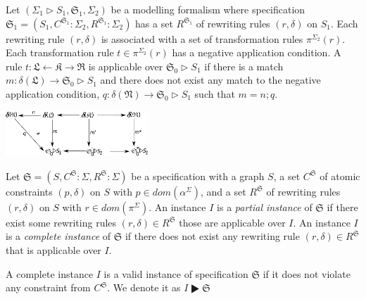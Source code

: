 \documentclass{eceasst}
\begin{document}
\begin{definition}
 Let $(\Sigma_1 \rhd S_1, \mathfrak{S}_1, \Sigma_2)$ be a modelling formalism where specification $\mathfrak{S}_1 = (S_1, C^{\mathfrak{S}_1}:\Sigma_2, R^{\mathfrak{S}_1}:\Sigma_2)$ 
 has a set $R^{\mathfrak{S}_1}$ of rewriting rules $(r, \delta)$ on $S_1$.
 Each rewriting rule $(r, \delta)$ is associated with a set of transformation rules $\pi^{\Sigma_2}(r)$. 
Each transformation rule $t \in \pi^{\Sigma_2}(r)$ has a negative application condition. 
A rule $t: \mathfrak{L} \leftarrow \mathfrak{K} \rightarrow  \mathfrak{R}$ is applicable over $\mathfrak{S}_0 \rhd S_1$ 
if there is a match $m : \delta( \mathfrak{L}) \rightarrow \mathfrak{S}_0 \rhd S_1$ 
and there does not exist any match to the negative application condition, $q : \delta( \mathfrak{N}) \rightarrow \mathfrak{S}_0 \rhd S_1$ such that $m = n ; q$. 

\begin{center}
\includegraphics[width=0.4\textwidth]{dpo2.pdf}
\end{center}
\end{definition}


\begin{definition}
 Let $\mathfrak{S} = (S, C^{\mathfrak{S}}:\Sigma, R^{\mathfrak{S}}:\Sigma )$ be a specification with 
 a graph $S$, 
 a set $C^\mathfrak{S}$ of atomic constraints $(p, \delta)$ on $S$ with $p \in dom(\alpha^\Sigma)$, and
 a set $R^\mathfrak{S}$ of rewriting rules $(r, \delta)$ on $S$ with $r \in dom(\pi^\Sigma)$. 
 An instance $I$ is a \textit{partial instance} of $\mathfrak{S}$ if there exist some rewriting rules $(r, \delta) \in R^{\mathfrak{S}}$ those are applicable over $I$. 
 An instance $I$ is a \textit{complete instance} of $\mathfrak{S}$ if there does not exist any rewriting rule $(r, \delta) \in R^{\mathfrak{S}}$ that is applicable over $I$. 

\end{definition}


\begin{remark}
A complete instance $I$ is a valid instance of specification $\mathfrak{S}$ if it does not violate any constraint from $C^{\mathfrak{S}}$. We denote it as $I \RHD \mathfrak{S}$
\end{remark}
\end{document}
